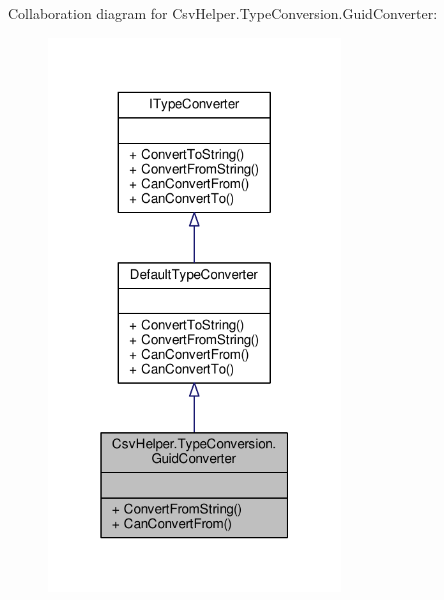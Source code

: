 Collaboration diagram for Csv\-Helper.\-Type\-Conversion.\-Guid\-Converter\-:
\nopagebreak
\begin{figure}[H]
\begin{center}
\leavevmode
\includegraphics[width=220pt]{a00531}
\end{center}
\end{figure}
